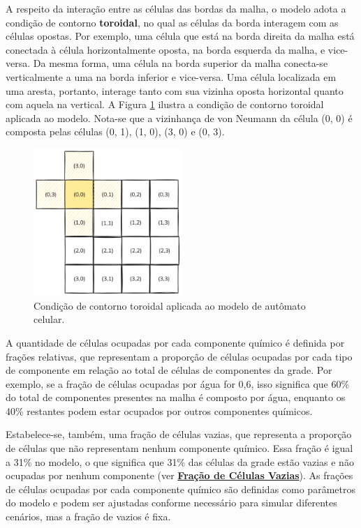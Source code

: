 \documentclass[12pt,oneside]{report}
\begin{document}
A respeito da interação entre as células das bordas da malha, o modelo adota a condição de contorno \textbf{toroidal}, no qual as células da borda interagem com as células opostas. Por exemplo, uma célula que está na borda direita da malha está conectada à célula horizontalmente oposta, na borda esquerda da malha, e vice-versa. Da mesma forma, uma célula na borda superior da malha conecta-se verticalmente a uma na borda inferior e vice-versa. Uma célula localizada em uma aresta, portanto, interage tanto com sua vizinha oposta horizontal quanto com aquela na vertical. A Figura \ref{fig:torus} ilustra a condição de contorno toroidal aplicada ao modelo. Nota-se que a vizinhança de von Neumann da célula (0, 0) é composta pelas células (0, 1), (1, 0), (3, 0) e (0, 3).

\begin{figure}[H]
    \centering
    \includegraphics[width=0.5\textwidth]{img/torus.png}
    \caption{\small Condição de contorno toroidal aplicada ao modelo de autômato celular.}
    \label{fig:torus}
\end{figure}

A quantidade de células ocupadas por cada componente químico é definida por frações relativas, que representam a proporção de células ocupadas por cada tipo de componente em relação ao total de células de componentes da grade. Por exemplo, se a fração de células ocupadas por água for 0,6, isso significa que 60\% do total de componentes presentes na malha é composto por água, enquanto os 40\% restantes podem estar ocupados por outros componentes químicos.

Estabelece-se, também, uma fração de células vazias, que representa a proporção de células que não representam nenhum componente químico. Essa fração é igual a 31\% no modelo, o que significa que 31\% das células da grade estão vazias e não ocupadas por nenhum componente (ver \hyperref[subsubsec:fracao_celulas_vazias]{\textbf{Fração de Células Vazias}}). As frações de células ocupadas por cada componente químico são definidas como parâmetros do modelo e podem ser ajustadas conforme necessário para simular diferentes cenários, mas a fração de vazios é fixa.
\end{document}
